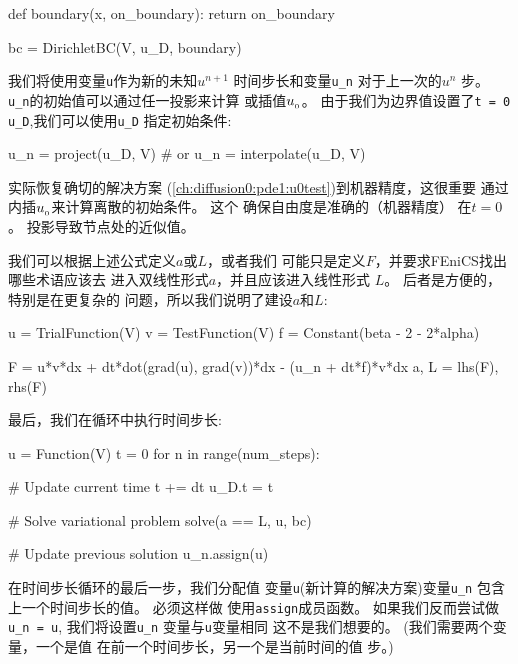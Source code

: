 \begin{python}
def boundary(x, on_boundary):
    return on_boundary

bc = DirichletBC(V, u_D, boundary)
\end{python}

我们将使用变量\texttt{u}作为新的未知$u^{n+1}$
时间步长和变量\verb!u_n! 对于上一次的$u^n$
步。 \verb!u_n!的初始值可以通过任一投影来计算
或插值$\uI$。 由于我们为边界值设置了\texttt{t = 0}
\verb!u_D!,我们可以使用\verb!u_D! 指定初始条件:

\begin{python}
u_n = project(u_D, V)
# or
u_n = interpolate(u_D, V)
\end{python}

\begin{notice}[投影与内插初始条件]
实际恢复确切的解决方案
(\ref{ch:diffusion0:pde1:u0test})到机器精度，这很重要
通过内插$\uI$来计算离散的初始条件。 这个
确保自由度是准确的（机器精度）
在$t=0$。 投影导致节点处的近似值。
\end{notice}


我们可以根据上述公式定义$a$或$L$，或者我们
可能只是定义$F$，并要求FEniCS找出哪些术语应该去
进入双线性形式$a$，并且应该进入线性形式
$L$。 后者是方便的，特别是在更复杂的
问题，所以我们说明了建设$a$和$L$:

\begin{python}
u = TrialFunction(V)
v = TestFunction(V)
f = Constant(beta - 2 - 2*alpha)

F = u*v*dx + dt*dot(grad(u), grad(v))*dx - (u_n + dt*f)*v*dx
a, L = lhs(F), rhs(F)
\end{python}

最后，我们在循环中执行时间步长:

\begin{python}
u = Function(V)
t = 0
for n in range(num_steps):

    # Update current time
    t += dt
    u_D.t = t

    # Solve variational problem
    solve(a == L, u, bc)

    # Update previous solution
    u_n.assign(u)
\end{python}
在时间步长循环的最后一步，我们分配值
变量\texttt{u}(新计算的解决方案)变量\verb!u_n!
包含上一个时间步长的值。 必须这样做
使用\texttt{assign}成员函数。 如果我们反而尝试做\verb!u_n = u!,
我们将设置\verb!u_n! 变量与\texttt{u}变量相同
这不是我们想要的。 (我们需要两个变量，一个是值
在前一个时间步长，另一个是当前时间的值
步。)

